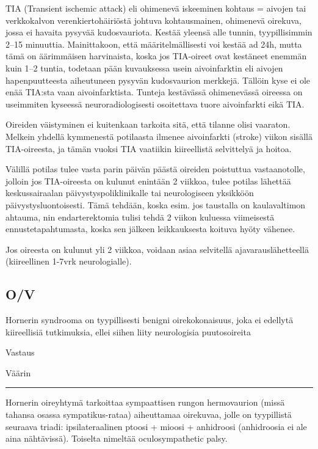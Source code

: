 \documentclass[
]{book}
\begin{document}
TIA (Transient ischemic attack) eli ohimenevä iskeeminen kohtaus = aivojen tai verkkokalvon verenkiertohäiriöstä johtuva kohtausmainen, ohimenevä oirekuva, jossa ei havaita pysyvää kudosvauriota. Kestää yleensä alle tunnin, tyypillisimmin 2--15 minuuttia. Mainittakoon, että määritelmällisesti voi kestää ad 24h, mutta tämä on äärimmäisen harvinaista, koska jos TIA-oireet ovat kestäneet enemmän kuin 1--2 tuntia, todetaan pään kuvauksessa usein aivoinfarktin eli aivojen hapenpuutteesta aiheutuneen pysyvän kudosvaurion merkkejä. Tällöin kyse ei ole enää TIA:sta vaan aivoinfarktista. Tunteja kestävässä ohimenevässä oireessa on useimmiten kyseessä neuroradiologisesti osoitettava tuore aivoinfarkti eikä TIA.

Oireiden väistyminen ei kuitenkaan tarkoita sitä, että tilanne olisi vaaraton. Melkein yhdellä kymmenestä potilaasta ilmenee aivoinfarkti (stroke) viikon sisällä TIA-oireesta, ja tämän vuoksi TIA vaatiikin kiireellistä selvittelyä ja hoitoa.

Välillä potilas tulee vasta parin päivän päästä oireiden poistuttua vastaanotolle, jolloin jos TIA-oireesta on kulunut enintään 2 viikkoa, tulee potilas lähettää keskussairaalan päivystyspoliklinikalle tai neurologiseen yksikköön päivystysluontoisesti. Tämä tehdään, koska esim. jos taustalla on kaulavaltimon ahtauma, nin endarterektomia tulisi tehdä 2 viikon kuluessa viimeisestä ennustetapahtumasta, koska sen jälkeen leikkauksesta koituva hyöty vähenee.

Jos oireesta on kulunut yli 2 viikkoa, voidaan asiaa selvitellä ajavarauslähetteellä (kiireellinen 1-7vrk neurologialle).

\subsection{O/V}\label{ov-1}

Hornerin syndrooma on tyypillisesti benigni oirekokonaisuus, joka ei edellytä kiireellisiä tutkimuksia, ellei siihen liity neurologisia puutosoireita

Vastaus

Väärin

\begin{center}\rule{0.5\linewidth}{0.5pt}\end{center}

Hornerin oireyhtymä tarkoittaa sympaattisen rungon hermovaurion (missä tahansa osassa sympatikus-rataa) aiheuttamaa oirekuvaa, jolle on tyypillistä seuraava triadi: ipsilateraalinen ptoosi + mioosi + anhidroosi (anhidroosia ei ale aina nähtävissä). Toiselta nimeltää oculosympathetic palsy.
\end{document}
